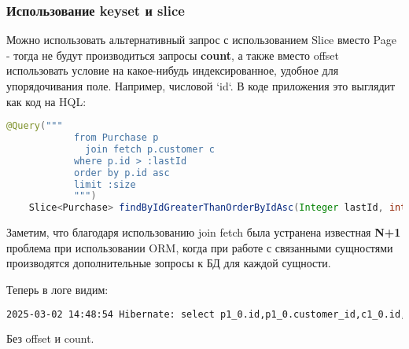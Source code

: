 \subsubsection{Использование keyset и slice}\label{subsubsec:slicekeysetpagination}
Можно использовать альтернативный запрос с использованием Slice вместо Page - тогда не будут производиться запросы
\textbf{count}, а также вместо offset использовать условие на какое-нибудь индексированное, удобное для упорядочивания
поле.
Например, числовой `id`.
В коде приложения это выглядит как код на HQL:
\begin{lstlisting}[language=java, frame=single, basicstyle=\normalsize\ttfamily, breaklines=true,label={lst:hqlquery}]
    @Query("""
            from Purchase p
              join fetch p.customer c
            where p.id > :lastId
            order by p.id asc
            limit :size
            """)
    Slice<Purchase> findByIdGreaterThanOrderByIdAsc(Integer lastId, int size);
\end{lstlisting}
Заметим, что благодаря использованию join fetch была устранена известная \textbf{N+1} проблема при использовании ORM,
когда при работе с связанными сущностями производятся дополнительные зопросы к БД для каждой сущности.

Теперь в логе видим:
\begin{lstlisting}[language=bash, frame=single, basicstyle=\normalsize\ttfamily, breaklines=true,label={lst:hiberpagelog}]
2025-03-02 14:48:54 Hibernate: select p1_0.id,p1_0.customer_id,c1_0.id,c1_0.bonus_points,c1_0.email,c1_0.loyalty_status,c1_0.name,c1_0.phone,p1_0.purchase_date,p1_0.shop_id,p1_0.total_amount from business.purchase p1_0 join business.customer c1_0 on c1_0.id=p1_0.customer_id where p1_0.id>? order by p1_0.id fetch first ? rows only
\end{lstlisting}

Без offset и count.